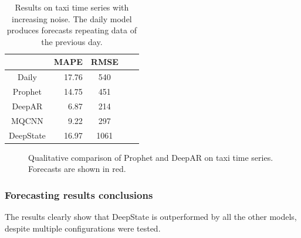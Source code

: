\documentclass[a4paper, 12pt]{article} %
\newcommand{\ra}[1]{\renewcommand{\arraystretch}{#1}}
\begin{document}
	\begin{table}\centering 
		\ra{1.3}
		\begin{tabular}{@{}crcrc@{}}
			\midrule
			& MAPE & RMSE\\
			\midrule
			Daily & 17.76 & 540\\
			Prophet & 14.75 & 451\\
			DeepAR & 6.87 & 214\\
			MQCNN & 9.22 & 297\\
			DeepState & 16.97 & 1061\\
			\bottomrule
		\end{tabular}
		\caption{Results on taxi time series with increasing noise. The daily model produces forecasts repeating data of the previous day. } \label{table:results_forecasting_taxi}
	\end{table}

	\begin{figure}\centering
		
		\caption{Qualitative comparison of Prophet and DeepAR on taxi time series. Forecasts are shown in red.}
		\label{fig:results_forecasting_taxi_prophet_deepar}
	\end{figure}
	
	\clearpage
	\subsubsection{Forecasting results conclusions}
	The results clearly show that DeepState is outperformed by all the other models, despite multiple configurations were tested.  
	
\end{document}
